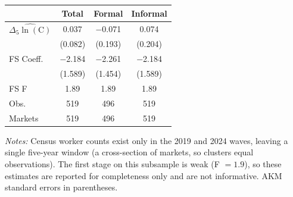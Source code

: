 \begin{threeparttable}
    \begin{tabular}{lccc}
        \toprule
        & Total & Formal & Informal \\
        \midrule
        $\widehat{\Delta_5\ln(\text{C})}$ & 0.037 & $-$0.071 & 0.074 \\
        & (0.082) & (0.193) & (0.204) \\
        \midrule
        FS Coeff. & $-$2.184 & $-$2.261 & $-$2.184 \\
                  & (1.589) & (1.454) & (1.589) \\
        FS F & 1.89 & 1.89 & 1.89 \\
        Obs. & 519 & 496 & 519 \\
        Markets & 519 & 496 & 519 \\
        \bottomrule
    \end{tabular}
    \begin{tablenotes}[flushleft]
        \footnotesize
        \item \textit{Notes:} Census worker counts exist only in the 2019 and 2024
        waves, leaving a single five-year window (a cross-section of markets, so
        clusters equal observations). The first stage on this subsample is weak
        (F $= 1.9$), so these estimates are reported for completeness only and are
        not informative. AKM standard errors in parentheses.
    \end{tablenotes}
\end{threeparttable}
